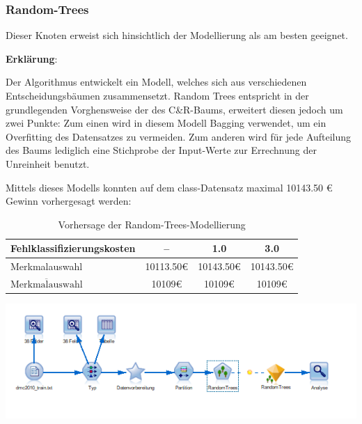 \documentclass[a4paper,12pt]{article}
\newcounter{Algorithmus}
\begin{document}
\subsubsection{Random-Trees}
Dieser Knoten erweist sich hinsichtlich der Modellierung als am besten geeignet.
\par
\vspace{0.2cm}
{\bf Erklärung}:
\par
\vspace{0.2cm}
Der Algorithmus entwickelt ein Modell, welches sich aus verschiedenen Entscheidungsbäumen zusammensetzt.
Random Trees entspricht in der grundlegenden Vorghensweise der des C\&R-Baums, erweitert
diesen jedoch um zwei Punkte: Zum einen wird in diesem Modell Bagging verwendet, um
ein Overfitting des Datensatzes zu vermeiden. Zum anderen wird für jede Aufteilung des Baums
lediglich eine Stichprobe der Input-Werte zur Errechnung der Unreinheit benutzt.
\par
\vspace{0.2cm}
Mittels dieses Modells konnten auf dem class-Datensatz maximal 10143.50 \euro\;  Gewinn vorhergesagt werden:

\begin{table}[h]
\begin{center}
	\begin{tabular}{l | c | c | c}
	
	Fehlklassifizierungskosten & -- &  1.0 &  3.0
	\\
	\hline
	Merkmalauswahl  & 10113.50\;\euro  & 10143.50\;\euro & 10143.50\;\euro
	\\
	$\overline{\text{Merkmalauswahl}}$  & 10109\;\euro &  10109\;\euro & 10109\;\euro
	
\end{tabular}
\caption{Vorhersage der Random-Trees-Modellierung}
\end{center}
\end{table}

\begin{center}
\includegraphics[width=\textwidth]{Screens/random_trees}
\end{center}
\end{document}
